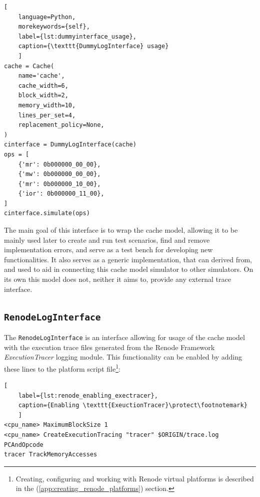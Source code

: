 \begin{center}
\centering
\begin{minipage}{\linewidth}
\begin{lstlisting}[
    language=Python,
	morekeywords={self},
    label={lst:dummyinterface_usage},
    caption={\texttt{DummyLogInterface} usage}
    ]
cache = Cache(
    name='cache',
    cache_width=6,
    block_width=2,
    memory_width=10,
    lines_per_set=4,
    replacement_policy=None,
)
cinterface = DummyLogInterface(cache)
ops = [
    {'mr': 0b000000_00_00},
    {'mw': 0b000000_00_00},
    {'mr': 0b000000_10_00},
    {'ior': 0b000000_11_00},    
]
cinterface.simulate(ops)
\end{lstlisting}
\end{minipage}
\end{center}

\noindent The main goal of this interface is to wrap the cache model, allowing it to be mainly used later to create and run test scenarios, find and remove implementation errors, and
serve as a test bench for developing new functionalities. It also serves as a generic implementation, that can derived from, and used to aid in connecting this cache model simulator
to other simulators. On its own this model does not, neither it aims to, provide any external trace interface.

\subsection{\texttt{RenodeLogInterface}}

The \texttt{RenodeLogInterface} is an interface allowing for usage of the cache model with the execution trace files generated from the Renode Framework \textit{ExecutionTracer} logging module.
This functionality can be enabled by adding these lines to the platform script file\footnote{Creating, configuring and working with Renode virtual platforms is described in the
(\ref{app:creating_renode_platforms}) section.}:

\begin{center}
\centering
\begin{minipage}{\linewidth}
\begin{lstlisting}[
    label={lst:renode_enabling_exectracer},
    caption={Enabling \texttt{ExeuctionTracer}\protect\footnotemark}
    ]
<cpu_name> MaximumBlockSize 1
<cpu_name> CreateExecutionTracing "tracer" $ORIGIN/trace.log PCAndOpcode
tracer TrackMemoryAccesses
\end{lstlisting}
\end{minipage}
\end{center}

